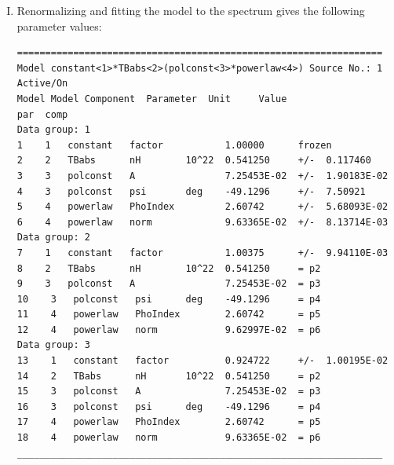 \begin{itemize}
\begin{enumerate}[I.]
\begin{verbatim}
Parameters defined:
=================================================================
Model constant<1>*TBabs<2>(polconst<3>*powerlaw<4>) Source No.: 1
Active/On
Model Model Component  Parameter  Unit     Value
par  comp
Data group: 1
1    1   constant   factor              1.00000      frozen
2    2   TBabs      nH         10^22    1.00000      +/-  0.0          
3    3   polconst   A                   1.00000      +/-  0.0          
4    3   polconst   psi        deg      45.0000      +/-  0.0          
5    4   powerlaw   PhoIndex            1.00000      +/-  0.0          
6    4   powerlaw   norm                1.00000      +/-  0.0          
Data group: 2
7    1   constant   factor              1.00000      +/-  0.0          
8    2   TBabs      nH         10^22    1.00000      = p2
9    3   polconst   A                   1.00000      = p3
10    3   polconst   psi        deg      45.0000      = p4
11    4   powerlaw   PhoIndex            1.00000      = p5
12    4   powerlaw   norm                1.00000      = p6
Data group: 3
13    1   constant   factor              1.00000      +/-  0.0          
14    2   TBabs      nH         10^22    1.00000      = p2
15    3   polconst   A                   1.00000      = p3
16    3   polconst   psi        deg      45.0000      = p4
17    4   powerlaw   PhoIndex            1.00000      = p5
18    4   powerlaw   norm                1.00000      = p6
_________________________________________________________________
        	\end{verbatim}
        	
        	\item Renormalizing and fitting the model to the spectrum gives the following parameter values:
        	\begin{verbatim}
=================================================================
Model constant<1>*TBabs<2>(polconst<3>*powerlaw<4>) Source No.: 1
Active/On
Model Model Component  Parameter  Unit     Value
par  comp
Data group: 1
1    1   constant   factor           1.00000      frozen
2    2   TBabs      nH        10^22  0.541250     +/-  0.117460     
3    3   polconst   A                7.25453E-02  +/-  1.90183E-02  
4    3   polconst   psi       deg    -49.1296     +/-  7.50921      
5    4   powerlaw   PhoIndex         2.60742      +/-  5.68093E-02  
6    4   powerlaw   norm             9.63365E-02  +/-  8.13714E-03  
Data group: 2
7    1   constant   factor           1.00375      +/-  9.94110E-03  
8    2   TBabs      nH        10^22  0.541250     = p2
9    3   polconst   A                7.25453E-02  = p3
10    3   polconst   psi      deg    -49.1296     = p4
11    4   powerlaw   PhoIndex        2.60742      = p5
12    4   powerlaw   norm            9.62997E-02  = p6
Data group: 3
13    1   constant   factor          0.924722     +/-  1.00195E-02  
14    2   TBabs      nH       10^22  0.541250     = p2
15    3   polconst   A               7.25453E-02  = p3
16    3   polconst   psi      deg    -49.1296     = p4
17    4   powerlaw   PhoIndex        2.60742      = p5
18    4   powerlaw   norm            9.63365E-02  = p6
_________________________________________________________________



\end{verbatim}
\end{enumerate}
\end{itemize}
